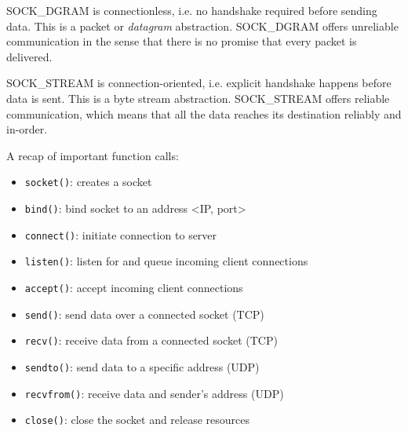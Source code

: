 SOCK\_DGRAM is connectionless, i.e. no handshake required before sending data.
This is a packet or \emph{datagram} abstraction. SOCK\_DGRAM offers unreliable
communication in the sense that there is no promise that every packet is
delivered.

SOCK\_STREAM is connection-oriented, i.e. explicit handshake happens before
data is sent. This is a byte stream abstraction. SOCK\_STREAM offers reliable
communication, which means that all the data reaches its destination reliably and
in-order.

A recap of important function calls:

\begin{itemize}
    \item \texttt{socket()}: creates a socket
    \item \texttt{bind()}: bind socket to an address <IP, port>
    \item \texttt{connect()}: initiate connection to server
    \item \texttt{listen()}: listen for and queue incoming client connections
    \item \texttt{accept()}: accept incoming client connections
    \item \texttt{send()}: send data over a connected socket (TCP)
    \item \texttt{recv()}: receive data from a connected socket (TCP)
    \item \texttt{sendto()}: send data to a specific address (UDP)
    \item \texttt{recvfrom()}: receive data and sender's address (UDP)
    \item \texttt{close()}: close the socket and release resources
\end{itemize}